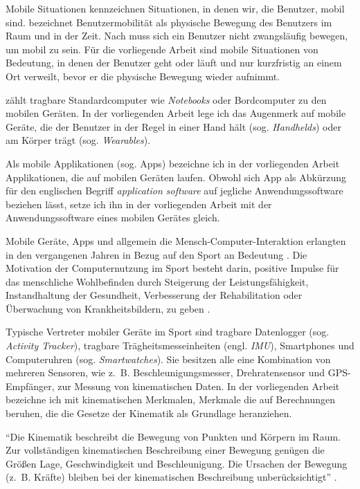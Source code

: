 Mobile Situationen kennzeichnen Situationen, in denen wir, die Benutzer, mobil sind. \citet[][S.~24~ff.]{Cooper2002} bezeichnet Benutzermobilität als physische Bewegung des Benutzers im Raum und in der Zeit. Nach \citet[][S.~7]{Roth2005} muss sich ein Benutzer nicht zwangsläufig bewegen, um mobil zu sein. Für die vorliegende Arbeit sind mobile Situationen von Bedeutung, in denen der Benutzer geht oder läuft und nur kurzfristig an einem Ort verweilt, bevor er die physische Bewegung wieder aufnimmt.

\citet[][S.~5]{Roth2005} zählt tragbare Standardcomputer wie \emph{Notebooks} oder Bordcomputer zu den mobilen Geräten. In der vorliegenden Arbeit lege ich das Augenmerk auf mobile Geräte, die der Benutzer in der Regel in einer Hand hält (sog. \emph{Handhelds}) oder am Körper trägt (sog. \emph{Wearables}).

Als mobile Applikationen (sog. Apps) bezeichne ich in der vorliegenden Arbeit Applikationen, die auf mobilen Geräten laufen. Obwohl sich App als Abkürzung für den englischen Begriff \emph{application software} auf jegliche Anwendungssoftware beziehen lässt, setze ich ihn in der vorliegenden Arbeit mit der Anwendungssoftware eines mobilen Gerätes gleich.

Mobile Geräte, Apps und allgemein die Mensch-Computer-Interaktion erlangten in den vergangenen Jahren in Bezug auf den Sport an Bedeutung \citep[vgl.][]{Nylander2014}. Die Motivation der Computernutzung im Sport besteht darin, positive Impulse für das menschliche Wohlbefinden durch Steigerung der Leistungsfähigkeit, Instandhaltung der Gesundheit, Verbesserung der Rehabilitation oder Überwachung von Krankheitsbildern, zu geben \citep[vgl.][]{DigitalSportsGroupatthePatternRecognitionLab}.

Typische Vertreter mobiler Geräte im Sport sind tragbare Datenlogger (sog. \emph{Activity Tracker}), tragbare Trägheitsmesseinheiten (engl. \emph{\ac{IMU}}), Smartphones und Computeruhren (sog. \emph{Smartwatches}). Sie besitzen alle eine Kombination von mehreren Sensoren, wie z.~B. Beschleunigungsmesser, Drehratensensor und \ac{GPS}-Empfänger, zur Messung von kinematischen Daten. In der vorliegenden Arbeit bezeichne ich mit kinematischen Merkmalen, Merkmale die auf Berechnungen beruhen, die die Gesetze der Kinematik als Grundlage heranziehen.

"`Die Kinematik beschreibt die Bewegung von Punkten und Körpern im Raum. Zur vollständigen kinematischen Beschreibung einer Bewegung genügen die Größen Lage, Geschwindigkeit und Beschleunigung. Die Ursachen der Bewegung (z.~B. Kräfte) bleiben bei der kinematischen Beschreibung unberücksichtigt"' \citep[][S.~57]{Disselhorst-Klug2015}.

